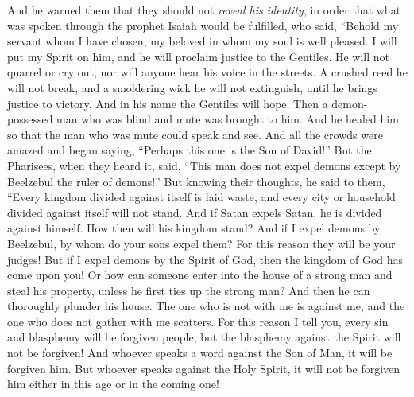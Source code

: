 \begin{biblechapter}
\verse And he warned them that they should not \textit{reveal his identity},
\verse in order that what was spoken through the prophet Isaiah would be fulfilled, who said,
\verse “Behold my servant whom I have chosen, 
my beloved in whom my soul is well pleased. 
I will put my Spirit on him, 
and he will proclaim justice to the Gentiles.
\verse He will not quarrel or cry out, 
nor will anyone hear his voice in the streets.
\verse A crushed reed he will not break, 
and a smoldering wick he will not extinguish, 
until he brings justice to victory.
\verse And in his name the Gentiles will hope.
 Then a demon-possessed man who was blind and mute was brought to him. And he healed him so that the man who was mute could speak and see.
\verse And all the crowds were amazed and began saying, “Perhaps this one is the Son of David!”
\verse But the Pharisees, when they heard it, said, “This man does not expel demons except by Beelzebul the ruler of demons!”
\verse But knowing their thoughts, he said to them, “Every kingdom divided against itself is laid waste, and every city or household divided against itself will not stand.
\verse And if Satan expels Satan, he is divided against himself. How then will his kingdom stand?
\verse And if I expel demons by Beelzebul, by whom do your sons expel them? For this reason they will be your judges!
\verse But if I expel demons by the Spirit of God, then the kingdom of God has come upon you!
\verse Or how can someone enter into the house of a strong man and steal his property, unless he first ties up the strong man? And then he can thoroughly plunder his house.
\verse The one who is not with me is against me, and the one who does not gather with me scatters.
\verse For this reason I tell you, every sin and blasphemy will be forgiven people, but the blasphemy against the Spirit will not be forgiven!
\verse And whoever speaks a word against the Son of Man, it will be forgiven him. But whoever speaks against the Holy Spirit, it will not be forgiven him either in this age or in the coming one!

\end{biblechapter}

